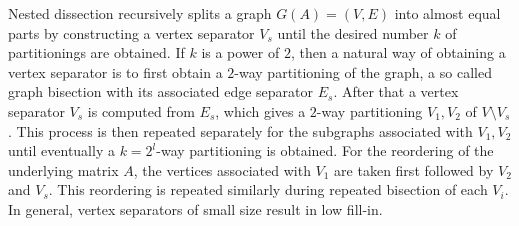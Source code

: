 Nested dissection recursively splits a graph $G(A)= (V,E)$ into almost
equal parts by constructing a vertex separator $V_s$ 
until the desired number $k$ 
of partitionings are obtained. If $k$ is a power of $2$, then a natural
way of obtaining a vertex separator
is to first obtain a $2$-way partitioning of the graph, a so called
graph bisection with its associated edge separator $E_s$.
After that a vertex separator $V_s$ is computed from $E_s$, which
gives a $2$-way partitioning $V_1,V_2$ of $V\setminus V_s$.
This process is then repeated separately
for the subgraphs associated with $V_1,V_2$ until eventually a
$k=2^l$-way partitioning is obtained. For the reordering of the
underlying matrix $A$, the vertices associated with $V_1$ are taken first
followed by $V_2$ and $V_s$. This reordering is repeated similarly during
repeated bisection of each $V_i$. In general, vertex separators
of small size result in low fill-in.

